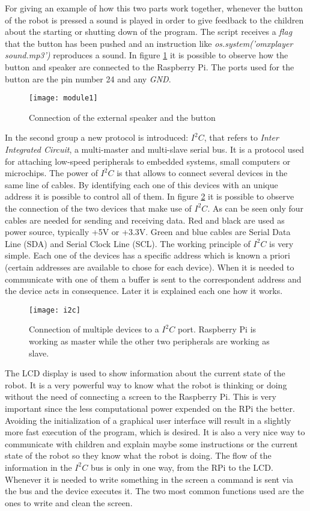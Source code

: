 For giving an example of how this two parts work together, whenever the button of the robot is pressed a sound is played in order to give feedback to the children about the starting or shutting down of the program. The script receives a \textit{flag} that the button has been pushed and an instruction like \textit{os.system('omxplayer sound.mp3')} reproduces a sound. In figure \ref{fig:module1} it is possible to observe how the button and speaker are connected to the Raspberry Pi. The ports used for the button are the pin number 24 and any \textit{GND}.

\begin{figure}[h]
\centering
\texttt{[image: module1]}
\caption{Connection of the external speaker and the button}
\label{fig:module1}
\end{figure}

In the second group a new protocol is introduced: $I^{2}C$, that refers to \textit{Inter Integrated Circuit}, a multi-master and multi-slave serial bus. It is a protocol used for attaching low-speed peripherals to embedded systems, small computers or microchips. The power of $I^{2}C$ is that allows to connect several devices in the same line of cables. By identifying each one of this devices with an unique address it is possible to control all of them. In figure \ref{fig:i2c} it is possible to observe the connection of the two devices that make use of $I^{2}C$. As can be seen only four cables are needed for sending and receiving data. Red and black are used as power source, typically +5V or +3.3V. Green and blue cables are Serial Data Line (SDA) and Serial Clock Line (SCL). The working principle of $I^{2}C$ is very simple. Each one of the devices has a specific address which is known a priori (certain addresses are available to chose for each device). When it is needed to communicate with one of them a buffer is sent to the correspondent address and the device acts in consequence. Later it is explained each one how it works.

\begin{figure}[h]
\centering
\texttt{[image: i2c]}
\caption{Connection of multiple devices to a $I^{2}C$ port. Raspberry Pi is working as master while the other two peripherals are working as slave.}
\label{fig:i2c}
\end{figure}


The LCD display is used to show information about the current state of the robot. It is a very powerful way to know what the robot is thinking or doing without the need of connecting a screen to the Raspberry Pi. This is very important since the less computational power expended on the RPi the better. Avoiding the initialization of a graphical user interface will result in a slightly more fast execution of the program, which is desired. It is also a very nice way to communicate with children and explain maybe some instructions or the current state of the robot so they know what the robot is doing. The flow of the information in the $I^{2}C$ bus is only in one way, from the RPi to the LCD. Whenever it is needed to write something in the screen a command is sent via the bus and the device executes it. The two most common functions used are the ones to write and clean the screen.

